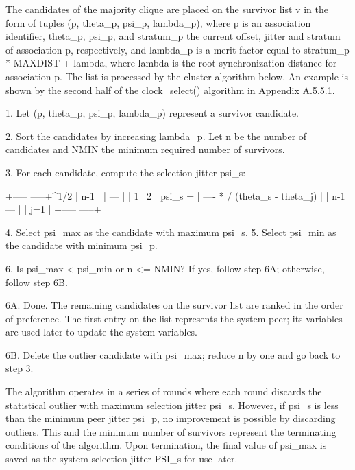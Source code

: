    The candidates of the majority clique are placed on the survivor list
   v in the form of tuples (p, theta_p, psi_p, lambda_p), where p is an
   association identifier, theta_p, psi_p, and stratum_p the current
   offset, jitter and stratum of association p, respectively, and
   lambda_p is a merit factor equal to stratum_p * MAXDIST + lambda,
   where lambda is the root synchronization distance for association p.
   The list is processed by the cluster algorithm below.  An example is
   shown by the second half of the clock_select() algorithm in
   Appendix A.5.5.1.

   1.  Let (p, theta_p, psi_p, lambda_p) represent a survivor candidate.

   2.  Sort the candidates by increasing lambda_p.  Let n be the number
   of candidates and NMIN the minimum required number of survivors.

   3.  For each candidate, compute the selection jitter psi_s:

             +-----                       -----+^1/2
             |        n-1                      |
             |        ---                      |
             |   1    \                     2  |
     psi_s = | ---- * /  (theta_s - theta_j)   |
             |  n-1   ---                      |
             |        j=1                      |
             +-----                       -----+

   4.  Select psi_max as the candidate with maximum psi_s.
    5.  Select psi_min as the candidate with minimum psi_p.

   6.  Is psi_max < psi_min or n <= NMIN?  If yes, follow step 6A;
   otherwise, follow step 6B.

   6A. Done.  The remaining candidates on the survivor list are ranked
   in the order of preference.  The first entry on the list represents
   the system peer; its variables are used later to update the system
   variables.

   6B. Delete the outlier candidate with psi_max; reduce n by one and go
   back to step 3.

   The algorithm operates in a series of rounds where each round
   discards the statistical outlier with maximum selection jitter psi_s.
   However, if psi_s is less than the minimum peer jitter psi_p, no
   improvement is possible by discarding outliers.  This and the minimum
   number of survivors represent the terminating conditions of the
   algorithm.  Upon termination, the final value of psi_max is saved as
   the system selection jitter PSI_s for use later.

